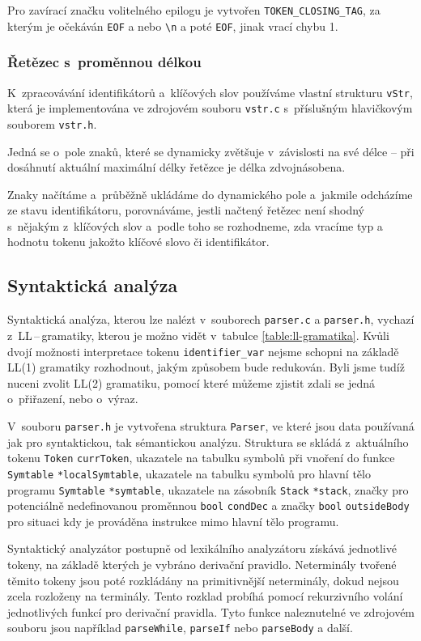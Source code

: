\documentclass[a4paper,12pt]{article}
\begin{document}
Pro zavírací značku volitelného epilogu je vytvořen \verb|TOKEN_CLOSING_TAG|, za kterým je očekáván \verb|EOF| a nebo \verb|\n| a poté \verb|EOF|, jinak vrací chybu 1.

\subsubsection{Řetězec s~proměnnou délkou}
K~zpracovávání identifikátorů a~klíčových slov používáme vlastní strukturu \verb|vStr|, která je implementována ve zdrojovém souboru \verb|vstr.c| s~příslušným hlavičkovým souborem \verb|vstr.h|.

Jedná se o~pole znaků, které se dynamicky zvětšuje v~závislosti na své délce -- při dosáhnutí aktuální maximální délky řetězce je délka zdvojnásobena. 

Znaky načítáme a~průběžně ukládáme do dynamického pole a~jakmile odcházíme ze stavu identifikátoru, porovnáváme, jestli načtený řetězec není shodný s~nějakým z~klíčových slov a~podle toho se rozhodneme, zda vracíme typ a hodnotu tokenu jakožto klíčové slovo či identifikátor.
\clearpage

\subsection{Syntaktická analýza}
Syntaktická analýza, kterou lze nalézt v~souborech \verb|parser.c| a \verb|parser.h|, vychazí z~LL\,--\,gramatiky, kterou je možno vidět v~tabulce \ref{table:ll-gramatika}. Kvůli dvojí možnosti interpretace tokenu \verb|identifier_var| nejsme schopni na základě LL(1) gramatiky rozhodnout, jakým způsobem bude redukován. Byli jsme tudíž nuceni zvolit LL(2) gramatiku, pomocí které můžeme zjistit zdali se jedná o~přiřazení, nebo o~výraz.

V~souboru \verb|parser.h| je vytvořena struktura \verb|Parser|, ve které jsou data používaná jak pro syntaktickou, tak sémantickou analýzu. Struktura se skládá z~aktuálního tokenu \verb|Token| \verb|currToken|, ukazatele na tabulku symbolů při vnoření do funkce \verb|Symtable| \verb|*localSymtable|, ukazatele na tabulku symbolů pro hlavní tělo programu \verb|Symtable| \verb|*symtable|, ukazatele na zásobník \verb|Stack| \verb|*stack|, značky pro potenciálně nedefinovanou proměnnou \verb|bool| \verb|condDec| a značky \verb|bool| \verb|outsideBody| pro situaci kdy je prováděna instrukce mimo hlavní tělo programu.

Syntaktický analyzátor postupně od lexikálního analyzátoru získává jednotlivé tokeny, na základě kterých je vybráno derivační pravidlo. Neterminály tvořené těmito tokeny jsou poté rozkládány na primitivnější neterminály, dokud nejsou zcela rozloženy na terminály. Tento rozklad probíhá pomocí rekurzivního volání jednotlivých funkcí pro derivační pravidla. Tyto funkce naleznutelné ve zdrojovém souboru jsou například \verb|parseWhile|, \verb|parseIf| nebo \verb|parseBody| a další.
\end{document}
